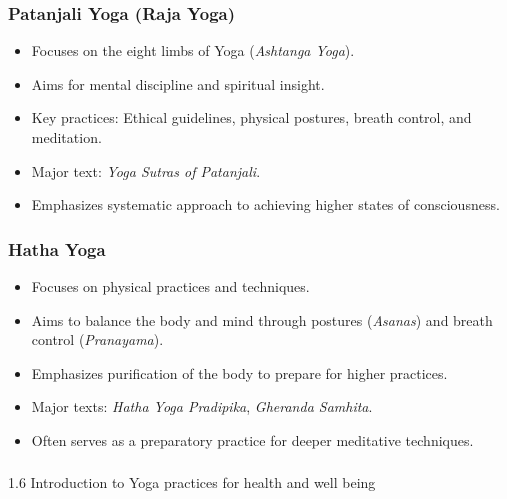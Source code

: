 \begin{frame}[fragile]\frametitle{Patanjali Yoga (Raja Yoga)}

      \begin{itemize}
		\item Focuses on the eight limbs of Yoga (\textit{Ashtanga Yoga}).
		\item Aims for mental discipline and spiritual insight.
		\item Key practices: Ethical guidelines, physical postures, breath control, and meditation.
		\item Major text: \textit{Yoga Sutras of Patanjali}.
		\item Emphasizes systematic approach to achieving higher states of consciousness.
	  \end{itemize}

\end{frame}

\begin{frame}[fragile]\frametitle{Hatha Yoga}

      \begin{itemize}
		\item Focuses on physical practices and techniques.
		\item Aims to balance the body and mind through postures (\textit{Asanas}) and breath control (\textit{Pranayama}).
		\item Emphasizes purification of the body to prepare for higher practices.
		\item Major texts: \textit{Hatha Yoga Pradipika}, \textit{Gheranda Samhita}.
		\item Often serves as a preparatory practice for deeper meditative techniques.
	  \end{itemize}

\end{frame}



\begin{frame}[fragile]\frametitle{}
\begin{center}
{\Large 1.6 Introduction to Yoga practices for health and well being}
\end{center}
\end{frame}

